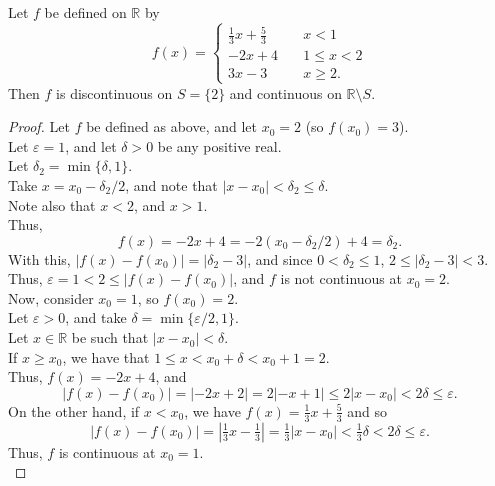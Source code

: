 \documentclass{article}
\newenvironment{theorem}[1]{\renewcommand\theinnercustomthm{#1}\innercustomthm}
  {\endinnercustomthm}
\begin{document}
\newpage{}
\begin{theorem}{5}
    Let $f$ be defined on $\mathbb R$ by
    \[f(x)=\begin{cases}\frac{1}{3}x+\frac{5}{3} &\quad x < 1 \\ -2x+4  &\quad 1 \le x < 2 \\ 3x -3  &\quad x \ge 2.\end{cases}\]
    Then $f$ is discontinuous on $S=\{2\}$ and continuous on $\mathbb R \setminus S$.
\end{theorem}
\begin{proof}
    Let $f$ be defined as above, and let $x_0 = 2$ (so $f(x_0) = 3$). \\
    Let $\varepsilon = 1$, and let $\delta > 0$ be any positive real. \\
    Let $\delta_2 = \min\{\delta, 1\}$. \\
    Take $x = x_0 - \delta_2/2$, and note that $|x- x_0| < \delta_2\le \delta$. \\
    Note also that $x < 2$, and $x > 1$. \\
    Thus, 
    \[f(x) =- 2x+4 = -2(x_0-\delta_2/2)+4=\delta_2.\]
    With this, $|f(x)-f(x_0)|=|\delta_2-3|$, and since $0 < \delta_2 \le 1$, $2 \le |\delta_2-3|< 3$. \\
    Thus, $\varepsilon = 1 < 2 \le |f(x)-f(x_0)|$, and $f$ is not continuous at $x_0 = 2$. \\

    Now, consider $x_0 = 1$, so $f(x_0)=2$. \\
    Let $\varepsilon > 0$, and take $\delta = \min \{\varepsilon/2, 1\}$. \\
    Let $x \in \mathbb R$ be such that $|x-x_0| < \delta$. \\
    If $x \ge x_0$, we have that $1\le x<x_0+\delta < x_0+1=2$. \\
    Thus, $f(x) = -2x+4$, and \[|f(x)-f(x_0)|=|-2x+2|=2|-x+1|\le 2|x-x_0| < 2\delta \le \varepsilon.\]
    On the other hand, if $x < x_0$, we have $f(x)=\frac{1}{3}x+\frac{5}{3}$ and so 
    \[ |f(x)-f(x_0)|=\left|\tfrac{1}{3}x - \tfrac{1}{3}\right|=\tfrac{1}{3}|x-x_0|< \tfrac{1}{3}\delta<2\delta \le \varepsilon.\]
    Thus, $f$ is continuous at $x_0 = 1$. \\


\end{proof}
\end{document}
